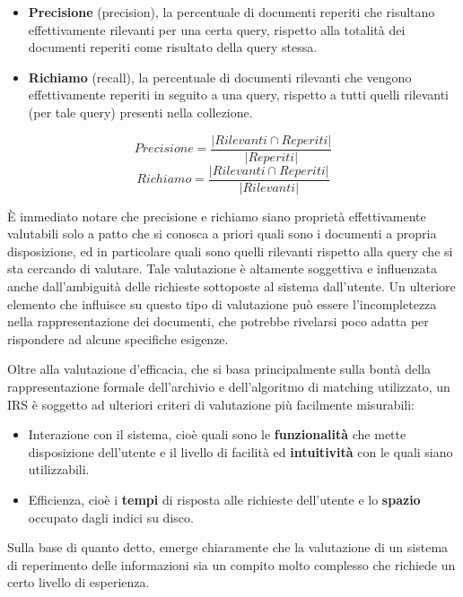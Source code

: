 \begin{itemize}
\item \textbf{Precisione} (precision), la percentuale di documenti reperiti che risultano effettivamente rilevanti per una certa query, rispetto alla totalità dei documenti reperiti come risultato della query stessa.
\item \textbf{Richiamo} (recall), la percentuale di documenti rilevanti che vengono effettivamente reperiti in seguito a una query, rispetto a tutti quelli rilevanti (per tale query) presenti nella collezione. 
\end{itemize}

\[ Precisione = \frac{|Rilevanti \cap Reperiti|}{|Reperiti|} \]
\[ Richiamo = \frac{|Rilevanti \cap Reperiti|}{|Rilevanti|} \]

\vspace{1em}

È immediato notare che precisione e richiamo siano proprietà effettivamente valutabili solo a patto che si conosca a priori quali sono i documenti a propria disposizione, ed in particolare quali sono quelli rilevanti rispetto alla query che si sta cercando di valutare. Tale valutazione è altamente soggettiva e influenzata anche dall’ambiguità delle richieste sottoposte al sistema dall’utente. Un ulteriore elemento che influisce su questo tipo di valutazione può essere l’incompletezza nella rappresentazione dei documenti, che potrebbe rivelarsi poco adatta per rispondere ad alcune specifiche esigenze.

\vspace{2em}

Oltre alla valutazione d’efficacia, che si basa principalmente sulla bontà della rappresentazione formale dell’archivio e dell’algoritmo di matching utilizzato, un IRS è soggetto ad ulteriori criteri di valutazione più facilmente misurabili:
\begin{itemize}
\item Interazione con il sistema, cioè quali sono le \textbf{funzionalità} che mette disposizione dell’utente e il livello di facilità ed \textbf{intuitività} con le quali siano utilizzabili. 
\item Efficienza, cioè i \textbf{tempi} di risposta alle richieste dell’utente e lo \textbf{spazio} occupato dagli indici su disco.
\end{itemize}

Sulla base di quanto detto, emerge chiaramente che la valutazione di un sistema di reperimento delle informazioni sia un compito molto complesso che richiede un certo livello di esperienza.





